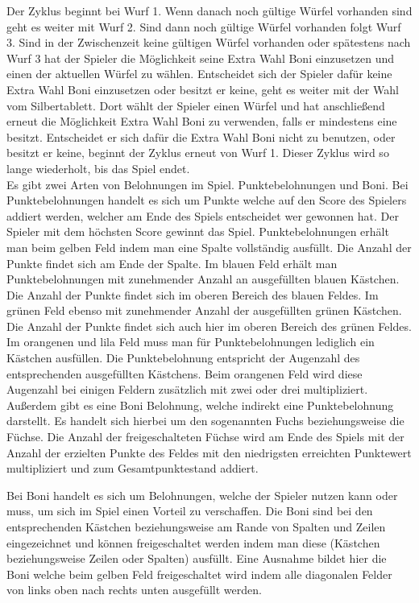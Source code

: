 Der Zyklus beginnt bei Wurf 1. Wenn danach noch gültige Würfel vorhanden sind geht es weiter mit Wurf 2. Sind dann noch gültige Würfel vorhanden folgt Wurf 3. Sind in der Zwischenzeit keine gültigen Würfel vorhanden oder spätestens nach Wurf 3 hat der Spieler die Möglichkeit seine Extra Wahl Boni einzusetzen und einen der aktuellen Würfel zu wählen. Entscheidet sich der Spieler dafür keine Extra Wahl Boni einzusetzen oder besitzt er keine, geht es weiter mit der Wahl vom Silbertablett. Dort wählt der Spieler einen Würfel und hat anschließend erneut die Möglichkeit Extra Wahl Boni zu verwenden, falls er mindestens eine besitzt. Entscheidet er sich dafür die Extra Wahl Boni nicht zu benutzen, oder besitzt er keine, beginnt der Zyklus erneut von Wurf 1. Dieser Zyklus wird so lange wiederholt, bis das Spiel endet.\\

Es gibt zwei Arten von Belohnungen im Spiel. Punktebelohnungen und Boni. Bei Punktebelohnungen handelt es sich um Punkte welche auf den Score des Spielers addiert werden, welcher am Ende des Spiels entscheidet wer gewonnen hat. Der Spieler mit dem höchsten Score gewinnt das Spiel. Punktebelohnungen erhält man beim gelben Feld indem man eine Spalte vollständig ausfüllt. Die Anzahl der Punkte findet sich am Ende der Spalte. Im blauen Feld erhält man Punktebelohnungen mit zunehmender Anzahl an ausgefüllten blauen Kästchen. Die Anzahl der Punkte findet sich im oberen Bereich des blauen Feldes. Im grünen Feld ebenso mit zunehmender Anzahl der ausgefüllten grünen Kästchen. Die Anzahl der Punkte findet sich auch hier im oberen Bereich des grünen Feldes. Im orangenen und lila Feld muss man für Punktebelohnungen lediglich ein Kästchen ausfüllen. Die Punktebelohnung entspricht der Augenzahl des entsprechenden ausgefüllten Kästchens. Beim orangenen Feld wird diese Augenzahl bei einigen Feldern zusätzlich mit zwei oder drei multipliziert. Außerdem gibt es eine Boni Belohnung, welche indirekt eine Punktebelohnung darstellt. Es handelt sich hierbei um den sogenannten Fuchs beziehungsweise die Füchse. Die Anzahl der freigeschalteten Füchse wird am Ende des Spiels mit der Anzahl der erzielten Punkte des Feldes mit den niedrigsten erreichten Punktewert multipliziert und zum Gesamtpunktestand addiert.

Bei Boni handelt es sich um Belohnungen, welche der Spieler nutzen kann oder muss, um sich im Spiel einen Vorteil zu verschaffen. Die Boni sind bei den entsprechenden Kästchen beziehungsweise am Rande von Spalten und Zeilen eingezeichnet und können freigeschaltet werden indem man diese (Kästchen beziehungsweise Zeilen oder Spalten) ausfüllt. Eine Ausnahme bildet hier die Boni welche beim gelben Feld freigeschaltet wird indem alle diagonalen Felder von links oben nach rechts unten ausgefüllt werden. \\

